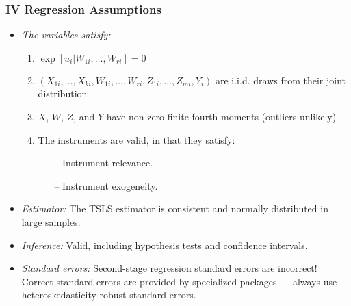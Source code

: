 

\begin{frame}
\frametitle{IV Regression Assumptions}
\begin{itemize}
\item \emph{The variables satisfy:}
\begin{enumerate}
\item $\exp[u_{i}|W_{1i},\ldots,W_{ri}]=0$
\item $(X_{1i},\ldots,X_{ki},W_{1i},\ldots,W_{ri},Z_{1i},\ldots,Z_{mi},Y_{i})$ are i.i.d. draws from their joint distribution
\item $X$, $W$, $Z$, and $Y$ have non-zero finite fourth moments (outliers unlikely)
\item The instruments are valid, in that they satisfy:
\begin{itemize}
\item[--] Instrument relevance.
\item[--] Instrument exogeneity.
\end{itemize}
\end{enumerate}
\item \emph{Estimator:} 
\newlinequad
The TSLS estimator is consistent and normally distributed in large samples. 
\item \emph{Inference:} 
\newlinequad
Valid, including hypothesis tests and confidence intervals. 
\item \emph{Standard errors:}
\newlinequad
Second-stage regression standard errors are incorrect! Correct standard errors are provided by specialized packages ---
always use heteroskedasticity-robust standard errors.
\end{itemize}
\end{frame}

